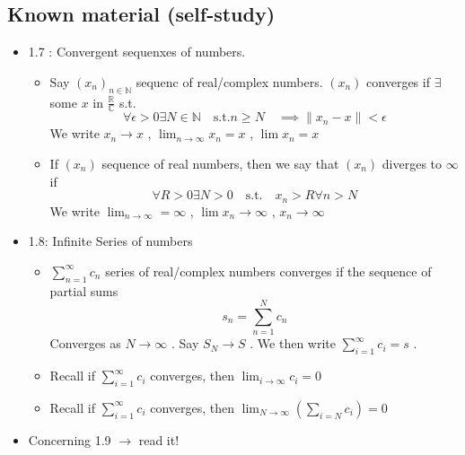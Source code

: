 \documentclass{article}
\theoremstyle{remark}
\begin{document}
   
 \subsection{Known material (self-study)}%
 \label{sub:known_material_self_study_}
 \begin{itemize}
   \item 1.7 :  Convergent sequenxes of numbers.
     \begin{itemize}
       \item Say $\left( x_{n} \right)_{n \in \mathbb{N} } $ sequenc of real/complex numbers. $\left( x_{n} \right)$ converges if $\exists$ some $x$ in $  \frac{\mathbb{R} }{\mathbb{C} } $ s.t. \[
       \forall \epsilon > 0 \exists N \in  \mathbb{N}  \quad \text{s.t.} n \ge N \quad  \implies  \|x_{n} - x \| < \epsilon   
       \] 
       We write $x_{n} \to  x$ , $\lim _{n \to  \infty} x_{n} = x$ , $\lim x_{n} = x$ 
     \item If $\left( x_{n} \right)$ sequence of real numbers, then we say that $\left( x_{n} \right) $ diverges to $\infty$ if \[
     \forall R > 0 \exists N> 0 \quad \text{s.t.} \quad  x_{n}> R \forall n >N  
     \] 
     We write $\lim_{n\to \infty} = \infty$ , $\lim x_{n} \to  \infty$ , $x_{n} \to  \infty$
     \end{itemize}
   \item 1.8: Infinite Series of numbers
     \begin{itemize}
       \item $\displaystyle \sum_{n= 1}^{\infty}  c_{n}$ series of real/complex numbers converges if the sequence of partial sums \[
       s_{n} = \sum_{n=1}^{N}  c_{n}
       \] 
       Converges as $ N \to  \infty$ . Say $ S_{N} \to  S$ . We then write $\sum_{i=1}^{\infty} c_{i} = s$ . 
     \item Recall if $\sum_{i=1}^{\infty}  c_{i} $ converges, then $\lim _{i \to  \infty} c_{i } = 0$
\item Recall if $\sum_{i=1}^{\infty}  c_{i} $ converges, then $\lim _{N\to \infty} \left( \sum_{i=N}^{} c_{i}  \right) = 0$ 
     \end{itemize}
\item  Concerning 1.9 $\to $ read it!
 \end{itemize}
 
 
   



\end{document}
